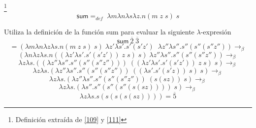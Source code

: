         \begin{definition}\footnote{Definición extraída de \hyperlink{109}{[109]} y  \hyperlink{111}{[111]}}
            $$\textsf{sum} =_{def}  \; \lambda m\lambda n\lambda s\lambda z.n(m \; z \; s) \; s$$
        \end{definition}

        \begin{exercise}
            Utiliza la definición de la función \textsf{sum} para evaluar la siguiente  $\lambda$-expresión
            \[
                \textsf{sum}\  \overline{2} \; \overline{3} 
            \]
            \[
                = (\lambda m\lambda n\lambda z\lambda s.n(m \; z \; s) \; s) \; \lambda z'\lambda s'.s'(s'z') \;\; \lambda z''\lambda s''.s''(s''(s''z'')) \rightarrow_\beta 
            \]
            \[
                (\lambda n\lambda z\lambda s.n((\lambda z'\lambda s'.s'(s'z')) \; z \; s) \; s) \; \lambda z''\lambda s''.s''(s''(s''z'')) \rightarrow_\beta 
            \]
            \[
                \lambda z\lambda s.((\lambda z''\lambda s''.s''(s''(s''z''))) \; ((\lambda z'\lambda s'.s'(s'z')) \; z \; s) \; s) \rightarrow_\beta
            \]
            \[
                \lambda z\lambda s.(\lambda z''\lambda s''.s''(s''(s''z'')) \; ((\lambda s'.s'(s'z))  \; s) \; s) \rightarrow_\beta
            \]
            \[
                \lambda z\lambda s.(\lambda z''\lambda s''.s''(s''(s''z'')) \; (s(sz)) \; s) \rightarrow_\beta
            \]
            \[
                \lambda z\lambda s.(\lambda s''.s''(s''(s''(s(sz)))) \; s) \rightarrow_\beta
            \]
            \[
                \lambda z\lambda s.s(s(s(s(sz)))) = \overline{5}
            \]
        \end{exercise}

